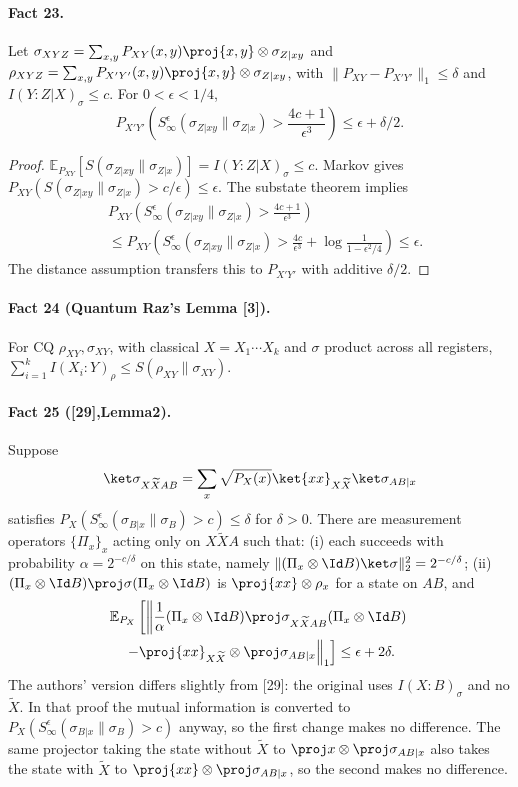 \paragraph{Fact 23.} Let $\sigma_{XYZ}=\sum_{x,y}P_{XY}(x,y)\proj{x,y}\otimes\sigma_{Z|xy}$ and $\rho_{XYZ}=\sum_{x,y}P_{X'Y'}(x,y)\proj{x,y}\otimes\sigma_{Z|xy}$, with $\|P_{XY}-P_{X'Y'}\|_1\le\delta$ and $I(Y:Z|X)_\sigma\le c$. For $0<\epsilon<1/4$,
\[P_{X'Y'}\left(S_\infty^\epsilon(\sigma_{Z|xy}\|\sigma_{Z|x})>\frac{4c+1}{\epsilon^3}\right)\le\epsilon+\delta/2.\]
\begin{proof}$\mathbb E_{P_{XY}}[S(\sigma_{Z|xy}\|\sigma_{Z|x})]=I(Y:Z|X)_\sigma\le c$. Markov gives $P_{XY}(S(\sigma_{Z|xy}\|\sigma_{Z|x})>c/\epsilon)\le\epsilon$. The substate theorem implies
\begin{align*}&P_{XY}\left(S_\infty^\epsilon(\sigma_{Z|xy}\|\sigma_{Z|x})>\frac{4c+1}{\epsilon^3}\right)\\&\le P_{XY}\left(S_\infty^\epsilon(\sigma_{Z|xy}\|\sigma_{Z|x})>\frac{4c}{\epsilon^3}+\log\frac1{1-\epsilon^2/4}\right)\le\epsilon.\end{align*}
The distance assumption transfers this to $P_{X'Y'}$ with additive $\delta/2$.\end{proof}
\paragraph{Fact 24 (Quantum Raz's Lemma [3]).} For CQ $\rho_{XY},\sigma_{XY}$, with classical $X=X_1\cdots X_k$ and $\sigma$ product across all registers, $\sum_{i=1}^kI(X_i:Y)_\rho\le S(\rho_{XY}\|\sigma_{XY})$.
\paragraph{Fact 25 ([29],Lemma2).} Suppose
\[\ket\sigma_{X\widetilde XAB}=\sum_x\sqrt{P_X(x)}\ket{xx}_{X\widetilde X}\ket\sigma_{AB|x}\]
satisfies $P_X(S_\infty^\epsilon(\sigma_{B|x}\|\sigma_B)>c)\le\delta$ for $\delta>0$. There are measurement operators $\{\Pi_x\}_x$ acting only on $X\widetilde XA$ such that: (i) each succeeds with probability $\alpha=2^{-c/\delta}$ on this state, namely $\|(\Pi_x\otimes\Id B)\ket\sigma\|_2^2=2^{-c/\delta}$; (ii) $(\Pi_x\otimes\Id B)\proj\sigma(\Pi_x\otimes\Id B)$ is $\proj{xx}\otimes\rho_x$ for a state on $AB$, and
\begin{multline*}\mathbb E_{P_X}\left[\left\|\frac1\alpha(\Pi_x\otimes\Id B)\proj\sigma_{X\widetilde XAB}(\Pi_x\otimes\Id B)\right.\right.\\\left.\left.-\proj{xx}_{X\widetilde X}\otimes\proj\sigma_{AB|x}\right\|_1\right]\le\epsilon+2\delta.\end{multline*}
The authors' version differs slightly from [29]: the original uses $I(X:B)_\sigma$ and no $\widetilde X$. In that proof the mutual information is converted to $P_X(S_\infty^\epsilon(\sigma_{B|x}\|\sigma_B)>c)$ anyway, so the first change makes no difference. The same projector taking the state without $\widetilde X$ to $\proj x\otimes\proj\sigma_{AB|x}$ also takes the state with $\widetilde X$ to $\proj{xx}\otimes\proj\sigma_{AB|x}$, so the second makes no difference.
